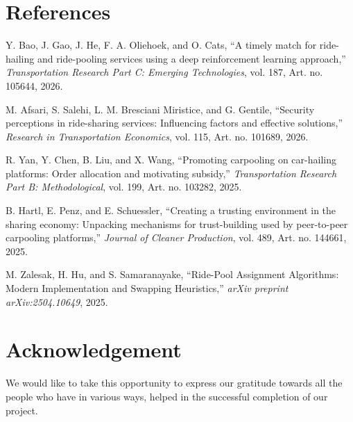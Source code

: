 \documentclass[12pt,a4paper,oneside]{report}
\begin{document}
\clearpage
{
\titlespacing*{\chapter}{0pt}{0cm}{1cm}
\chapter*{References}
}
\begin{enumerate}[label={[\arabic*]},leftmargin=2.1em,itemsep=0.7em]
\item Y. Bao, J. Gao, J. He, F. A. Oliehoek, and O. Cats, ``A timely match for
ride-hailing and ride-pooling services using a deep reinforcement learning
approach,'' \textit{Transportation Research Part C: Emerging Technologies},
vol. 187, Art. no. 105644, 2026.

\item M. Afsari, S. Salehi, L. M. Bresciani Miristice, and G. Gentile,
``Security perceptions in ride-sharing services: Influencing factors and
effective solutions,'' \textit{Research in Transportation Economics}, vol.
115, Art. no. 101689, 2026.

\item R. Yan, Y. Chen, B. Liu, and X. Wang, ``Promoting carpooling on
car-hailing platforms: Order allocation and motivating subsidy,''
\textit{Transportation Research Part B: Methodological}, vol. 199, Art. no.
103282, 2025.

\item B. Hartl, E. Penz, and E. Schuessler, ``Creating a trusting environment
in the sharing economy: Unpacking mechanisms for trust-building used by
peer-to-peer carpooling platforms,'' \textit{Journal of Cleaner Production},
vol. 489, Art. no. 144661, 2025.

\item M. Zalesak, H. Hu, and S. Samaranayake, ``Ride-Pool Assignment
Algorithms: Modern Implementation and Swapping Heuristics,'' \textit{arXiv
preprint arXiv:2504.10649}, 2025.
\end{enumerate}

\clearpage
{
\titlespacing*{\chapter}{0pt}{0cm}{1cm}
\chapter*{Acknowledgement}
}
We would like to take this opportunity to express our gratitude towards all the people who have in various ways, helped in the successful completion of our project.
\end{document}
